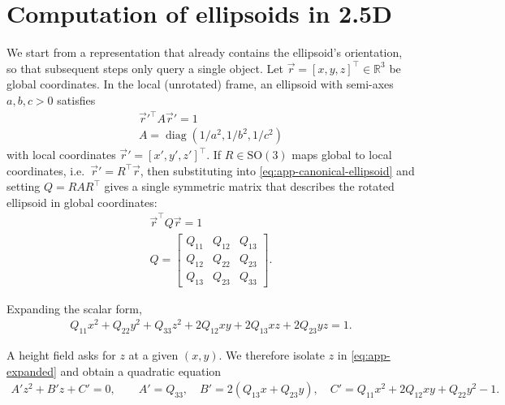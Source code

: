 \resetgraphicspath
{}


\chapter{Computation of ellipsoids in 2.5D}
\label{app:ellipsoid-matrix}


We start from a representation that already contains the ellipsoid’s orientation, so that subsequent steps only query a single object. Let $\vec r=[x,y,z]^\top \in\mathbb{R}^3$ be global coordinates. In the local (unrotated) frame, an ellipsoid with semi-axes $a,b,c>0$ satisfies
\begin{align}
    \label{eq:app-canonical-ellipsoid}
    \vec r'^\top  A \vec r' = 1 \\
    A=\operatorname{diag}\!\left(1/a^2, 1/b^2, 1/c^2\right)
\end{align}
with local coordinates $\vec r'=[x',y',z']^\top $. If $R\in \mathrm{SO}(3)$ maps global to local coordinates, i.e.\ $\vec r'=R^\top \vec r$, then substituting into \cref{eq:app-canonical-ellipsoid} and setting $Q=RAR^\top $ gives a single symmetric matrix that describes the rotated ellipsoid in global coordinates:
\begin{align}
    \label{eq:app-global-implicit}
    \vec r^\top  Q \vec r = 1 \\
    Q =
    \begin{bmatrix}
        Q_{11} & Q_{12} & Q_{13}\\
        Q_{12} & Q_{22} & Q_{23}\\
        Q_{13} & Q_{23} & Q_{33}
    \end{bmatrix}.
\end{align}

Expanding the scalar form,
\begin{align}
    \label{eq:app-expanded}
    Q_{11}x^2 + Q_{22}y^2 + Q_{33}z^2 + 2Q_{12}xy + 2Q_{13}xz + 2Q_{23}yz = 1.
\end{align}

A height field asks for $z$ at a given $(x,y)$. We therefore isolate $z$ in \cref{eq:app-expanded} and obtain a quadratic equation
\begin{align}
    \label{eq:app-quadratic-coeffs}
    A' z^2 + B' z + C' = 0,
    \qquad
    A' = Q_{33},\quad
    B' = 2(Q_{13}x + Q_{23}y),\quad
    C' = Q_{11}x^2 + 2Q_{12}xy + Q_{22}y^2 - 1.
\end{align}

